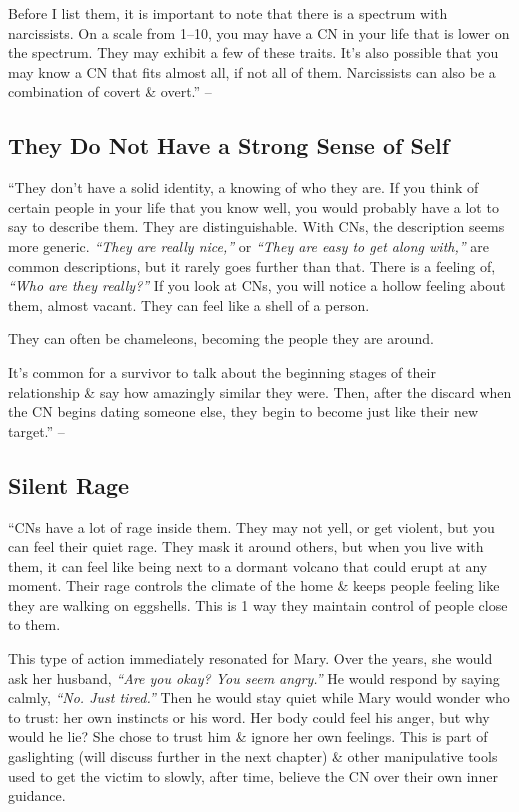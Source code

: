 \documentclass{article}
\numberwithin{equation}{section}
\begin{document}
Before I list them, it is important to note that there is a spectrum with narcissists. On a scale from 1--10, you may have a CN in your life that is lower on the spectrum. They may exhibit a few of these traits. It's also possible that you may know a CN that fits almost all, if not all of them. Narcissists can also be a combination of covert \& overt.'' -- \cite[p. 51]{Mirza2017}

\subsection{They Do Not Have a Strong Sense of Self}
``They don't have a solid identity, a knowing of who they are. If you think of certain people in your life that you know well, you would probably have a lot to say to describe them. They are distinguishable. With CNs, the description seems more generic. \textit{``They are really nice,''} or \textit{``They are easy to get along with,''} are common descriptions, but it rarely goes further than that. There is a feeling of, \textit{``Who are they really?''} If you look at CNs, you will notice a hollow feeling about them, almost vacant. They can feel like a shell of a person.

They can often be chameleons, becoming the people they are around.

It's common for a survivor to talk about the beginning stages of their relationship \& say how amazingly similar they were. Then, after the discard when the CN begins dating someone else, they begin to become just like their new target.'' -- \cite[p. 51]{Mirza2017}

\subsection{Silent Rage}
``CNs have a lot of rage inside them. They may not yell, or get violent, but you can feel their quiet rage. They mask it around others, but when you live with them, it can feel like being next to a dormant volcano that could erupt at any moment. Their rage controls the climate of the home \& keeps people feeling like they are walking on eggshells. This is 1 way they maintain control of people close to them.

This type of action immediately resonated for Mary. Over the years, she would ask her husband, \textit{``Are you okay? You seem angry.''} He would respond by saying calmly, \textit{``No. Just tired.''} Then he would stay quiet while Mary would wonder who to trust: her own instincts or his word. Her body could feel his anger, but why would he lie? She chose to trust him \& ignore her own feelings. This is part of gaslighting (will discuss further in the next chapter) \& other manipulative tools used to get the victim to slowly, after time, believe the CN over their own inner guidance.
\end{document}
